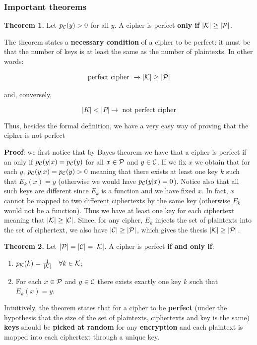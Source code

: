 \subsubsection{Important theorems}
\textbf{Theorem 1.} Let $p_{\cal C}(y)>0$ for all $y$. A cipher is perfect \textbf{only if} $|{\cal K}| \geq |{\cal P}|$.

The theorem states a \textbf{necessary condition} of a cipher to be perfect: it must be that the number of keys is at least the same as the number of plaintexts. In other words:

$$
\text{perfect cipher } \xrightarrow{} |\cal K| \geq |\cal P| 
$$

and, conversely,

$$
|K| < |P| \xrightarrow{} \text{ not perfect cipher}
$$

Thus, besides the formal definition, we have a very easy way of proving that the cipher is not perfect

\textbf{Proof}: we first notice that by Bayes theorem we have that a cipher is perfect if an only if $p_{\cal C}(y|x)=p_{\cal C}(y)$ for all $x \in {\cal P}$ and $y \in {\cal C}$. If we fix $x$ we obtain that for each $y$, $p_{\cal C}(y|x)=p_{\cal C}(y)>0$ meaning that there exists at least one key $k$ such that $E_k(x) = y$ (otherwise we would have $p_{\cal C}(y|x)=0$). Notice also that all such keys are different since $E_k$ is a function and we have fixed $x$. In fact, $x$ cannot be mapped to two different ciphertexts by the same key (otherwise $E_k$ would not be a function). Thus we have at least one key for each ciphertext meaning that $|{\cal K}| \geq |{\cal C}|$. Since, for any cipher, $E_k$ injects the set of plaintexts into the set of ciphertext, we also have $|{\cal C}| \geq |{\cal P}|$, which gives the thesis $|{\cal K}| \geq |{\cal P}|$.

\textbf{Theorem 2.} Let $|{\cal P}| = |{\cal C}| = |{\cal K}|$. A cipher is perfect \textbf{if and only if}:

\begin{enumerate}
    \item $p_{\cal K}(k) = \frac{1}{|{\cal K}|} \quad \forall k \in {\cal K}$;
    \item For each $x \in {\cal P}$ and $y \in {\cal C}$ there exists exactly one key $k$ such that $E_k(x)=y$.
\end{enumerate}

Intuitively, the theorem states that for a cipher to be \textbf{perfect} (under the hypothesis that the size of the set of plaintexts, ciphertexts and key is the same) \textbf{keys} should be \textbf{picked at random} for any \textbf{encryption} and each plaintext is mapped into each ciphertext through a unique key.

